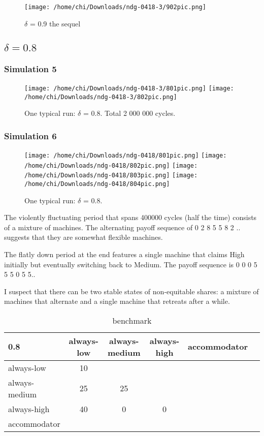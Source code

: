 \documentclass[12.5pt]{report}
\begin{document}
\begin{figure}[h!]
\center
\texttt{[image: /home/chi/Downloads/ndg-0418-3/902pic.png]}
\caption{$\delta$ = 0.9 the sequel}
\end{figure}


\subsection{$\delta = 0.8$}

\subsubsection{Simulation 5}

\begin{figure}[h!]

\texttt{[image: /home/chi/Downloads/ndg-0418-3/801pic.png]}
\texttt{[image: /home/chi/Downloads/ndg-0418-3/802pic.png]}

\caption{One typical run: $\delta$ = 0.8. Total 2 000 000 cycles.}
\end{figure}


\subsubsection{Simulation 6}
\begin{figure}[h!]

\texttt{[image: /home/chi/Downloads/ndg-0418/801pic.png]}
\texttt{[image: /home/chi/Downloads/ndg-0418/802pic.png]}
\texttt{[image: /home/chi/Downloads/ndg-0418/803pic.png]}
\texttt{[image: /home/chi/Downloads/ndg-0418/804pic.png]}

\caption{One typical run: $\delta$ = 0.8.}
\end{figure}

The violently fluctuating period that spans 400000 cycles (half the time) consists of a mixture of machines. The alternating payoff sequence of 0 2 8 5 5 8 2 .. suggests that they are somewhat flexible machines.

The flatly down period at the end features a single machine that claims High initially but eventually switching back to Medium. The payoff sequence is 0 0 0 5 5 5 0 5 5..

I suspect that there can be two stable states of non-equitable shares: a mixture of machines that alternate and a single machine that retreats after a while.


\begin{table}[h!]
\center
\begin{tabular}{l|ccccc}
\textbf{0.8}& always-low & always-medium & always-high & accommodator\\
\hline
always-low    & 10 &     &    &   \\
always-medium & 25 & 25 &    & \\
always-high   & 40 &  0  & 0  & \\
accommodator  &     &     &  & \\
\end{tabular}
\caption{benchmark}
\end{table}
\end{document}
